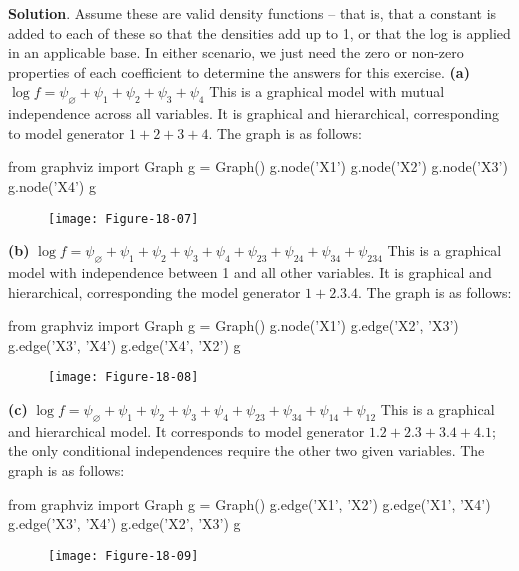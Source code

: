 \textbf{Solution}. Assume these are valid density functions --
that is, that a constant is added to each of these so that the densities
add up to 1, or that the log is applied in an applicable base. In either
scenario, we just need the zero or non-zero properties of each
coefficient to determine the answers for this exercise.
\textbf{(a)}
\(\log f = \psi_\varnothing + \psi_{1} + \psi_{2} + \psi_{3} + \psi_{4}\)
This is a graphical model with mutual independence across all variables.
It is graphical and hierarchical, corresponding to model generator
\(1 + 2 + 3 + 4\). The graph is as follows:

\begin{python}
from graphviz import Graph
g = Graph()
g.node('X1')
g.node('X2')
g.node('X3')
g.node('X4')
g
\end{python}

\begin{figure}[H]
\centering
\texttt{[image: Figure-18-07]}
\end{figure}

\textbf{(b)}
\(\log f = \psi_\varnothing + \psi_{1} + \psi_{2} + \psi_{3} + \psi_{4} + \psi_{23} + \psi_{24} + \psi_{34} + \psi_{234}\)
This is a graphical model with independence between 1 and all other
variables. It is graphical and hierarchical, corresponding the model
generator \(1 + 2.3.4\). The graph is as follows:

\begin{python}
from graphviz import Graph
g = Graph()
g.node('X1')
g.edge('X2', 'X3')
g.edge('X3', 'X4')
g.edge('X4', 'X2')
g
\end{python}

\begin{figure}[H]
\centering
\texttt{[image: Figure-18-08]}
\end{figure}

\textbf{(c)}
\(\log f = \psi_\varnothing + \psi_{1} + \psi_{2} + \psi_{3} + \psi_{4} + \psi_{23} + \psi_{34} + \psi_{14} + \psi_{12}\)
This is a graphical and hierarchical model. It corresponds to model
generator \(1.2 + 2.3 + 3.4 + 4.1\); the only conditional independences
require the other two given variables. The graph is as follows:

\begin{python}
from graphviz import Graph
g = Graph()
g.edge('X1', 'X2')
g.edge('X1', 'X4')
g.edge('X3', 'X4')
g.edge('X2', 'X3')
g
\end{python}

\begin{figure}[H]
\centering
\texttt{[image: Figure-18-09]}
\end{figure}

